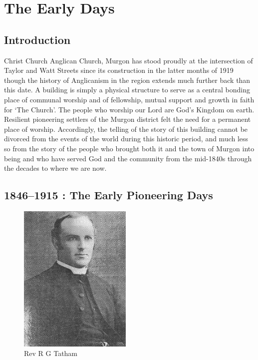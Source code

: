 \chapter{The Early Days}

\section{Introduction}

Christ Church Anglican Church, Murgon has stood proudly at the
intersection of Taylor and Watt Streets since its construction in the
latter months of 1919 though the history of Anglicanism in the region
extends much further back than this date. A building is simply a
physical structure to serve as a central bonding place of communal
worship and of fellowship, mutual support and growth in faith for `The
Church'. The people who worship our Lord are God's Kingdom on earth.
Resilient pioneering settlers of the Murgon district felt the need for a
permanent place of worship. Accordingly, the telling of the story of
this building cannot be divorced from the events of the world during
this historic period, and much less so from the story of the people who
brought both it and the town of Murgon into being and who have served
God and the community from the mid-1840s through the decades to where we
are now.

\section{1846--1915 : The Early Pioneering
Days}




\begin{figure}
\begin{center}
\includegraphics[width=0.48\textwidth,right]{images/RGTatham.jpg}
\caption{Rev R G Tatham}
\end{center}
\end{figure}


